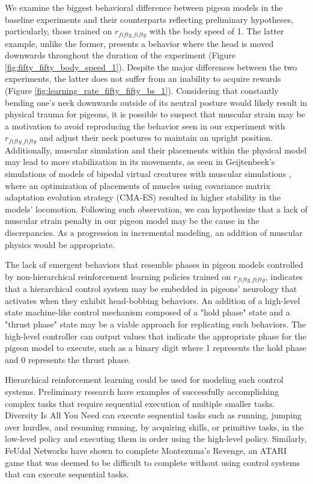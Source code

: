   We examine the biggest behavioral difference between pigeon models in the baseline experiments and their counterparts reflecting preliminary hypotheses, particularly, those trained on $r_{fifty\_fifty}$ with the body speed of 1.
  The latter example, unlike the former, presents a behavior where the head is moved downwards throughout the duration of the experiment (Figure \ref{fig:fifty_fifty_body_speed_1}).
  Despite the major differences between the two experiments, the latter does not suffer from an inability to acquire rewards (Figure \ref{fig:learning_rate_fifty_fifty_bs_1}).
  Considering that constantly bending one's neck downwards outside of its neutral posture would likely result in physical trauma for pigeons, it is possible to suspect that muscular strain may be a motivation to avoid reproducing the behavior seen in our experiment with $r_{fifty\_fifty}$ and adjust their neck postures to maintain an upright position.
  Additionally, muscular simulation and their placements within the physical model may lead to more stabilization in its movements, as seen in Geijtenbeek's simulations of models of bipedal virtual creatures with muscular simulations \cite{geijtenbeek2013flexible}, where an optimization of placements of muscles using covariance matrix adaptation evolution strategy (CMA-ES) resulted in higher stability in the models' locomotion.
  Following such observation, we can hypothesize that a lack of muscular strain penalty in our pigeon model may be the cause in the discrepancies. As a progression in incremental modeling, an addition of muscular physics would be appropriate.


  The lack of emergent behaviors that resemble phases in pigeon models controlled by non-hierarchical reinforcement learning policies trained on $r_{fifty\_fifty}$, indicates that a hierarchical control system may be embedded in pigeons' neurology that activates when they exhibit head-bobbing behaviors.
  An addition of a high-level state machine-like control mechanism composed of a "hold phase" state and a "thrust phase" state may be a viable approach for replicating such behaviors.
  The high-level controller can output values that indicate the appropriate phase for the pigeon model to execute, such as a binary digit where 1 represents the hold phase and 0 represents the thrust phase.

  Hierarchical reinforcement learning could be used for modeling such control systems.
  Preliminary research have examples of successfully accomplishing complex tasks that require sequential execution of multiple smaller tasks.
  Diversity Is All You Need \cite{eysenbach2018diversity} can execute sequential tasks such as running, jumping over hurdles, and resuming running, by acquiring skills, or primitive tasks, in the low-level policy and executing them in order using the high-level policy.
  Similarly, FeUdal Networks \cite{vezhnevets2017feudal} have shown to complete Montezuma's Revenge, an ATARI game that was deemed to be difficult to complete without using control systems that can execute sequential tasks.


